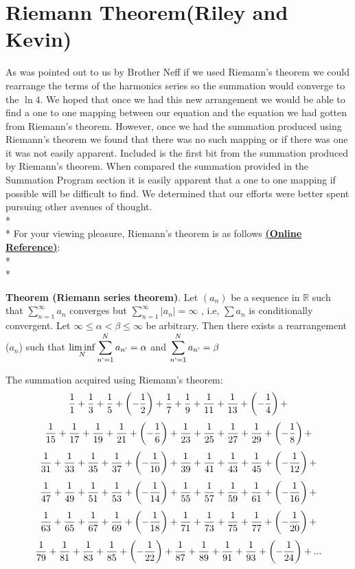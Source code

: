 \documentclass{article}
\begin{document}
\section{Riemann Theorem(Riley and Kevin)}
As was pointed out to us by Brother Neff if we used Riemann's theorem we could rearrange the terms of the harmonics series so the summation would converge to the $\ln 4$.  We hoped that once we had this new arrangement we would be able to find a one to one mapping between our equation and the equation we had gotten from Riemann's theorem. However, once we had the summation produced using Riemann's theorem we found that there was no such mapping or if there was one it was not easily apparent. Included is the first bit from the summation produced by Riemann's theorem. When compared the summation provided in the Summation Program section it is easily apparent that a one to one mapping if possible will be difficult to find. We determined that our efforts were better spent pursuing other avenues of thought.
\\*
\\* For your viewing pleasure, Riemann's theorem is as follows \href{http://planetmath.org/encyclopedia/ConditionallyConvergentSeriesOfRealNumbersCanBeRearrangedToConvergeToAnyNumber.html}{{\bf(Online Reference)}}:
\\*
\\*

{\bf Theorem (Riemann series theorem)}. Let $(a _{n})$ be a sequence in $\mathbb{R}$ such that $ \sum_{n=1}^{\infty} a _{n} $  converges but $ \sum_{n=1}^{\infty} |a _{n}| = \infty$ , i.e,  $ \sum a_{n} $ is conditionally convergent. Let $\infty \leq \alpha < \beta \leq \infty$  be arbitrary. Then there exists a rearrangement ($a _{n}$) such that $ \displaystyle\liminf_{N}   \sum_{n`=1}^{N} a _{n`} = \alpha$ and $\displaystyle\sum_{n`=1}^{N} a _{n`} = \beta$

The summation acquired using Riemann's theorem:
$${1 \over 1}+{1 \over 3}+{1 \over 5}+\left(- {1 \over 2}\right)+{1 \over 7}+{1 \over 9}+{1 \over 11}+{1 \over 13}+\left(- {1 \over 4}\right)+ $$
$${1 \over 15}+{1 \over 17}+{1 \over 19}+{1 \over 21}+\left(- {1 \over 6}\right)+{1 \over 23}+{1 \over 25}+{1 \over 27}+{1 \over 29}+\left(- {1 \over 8}\right)+ $$
$${1 \over 31}+{1 \over 33}+{1 \over 35}+{1 \over 37}+\left(- {1 \over 10}\right)+{1 \over 39}+{1 \over 41}+{1 \over 43}+{1 \over 45}+\left(- {1 \over 12}\right)+ $$
$${1 \over 47}+{1 \over 49}+{1 \over 51}+{1 \over 53}+\left(- {1 \over 14}\right)+{1 \over 55}+{1 \over 57}+{1 \over 59}+{1 \over 61}+\left(- {1 \over 16}\right)+ $$
$${1 \over 63}+{1 \over 65}+{1 \over 67}+{1 \over 69}+\left(- {1 \over 18}\right)+{1 \over 71}+{1 \over 73}+{1 \over 75}+{1 \over 77}+\left(- {1 \over 20}\right)+ $$
$${1 \over 79}+{1 \over 81}+{1 \over 83}+{1 \over 85}+\left(- {1 \over 22}\right)+{1 \over 87}+{1 \over 89}+{1 \over 91}+{1 \over 93}+\left(- {1 \over 24}\right)+ ... $$
\end{document}
